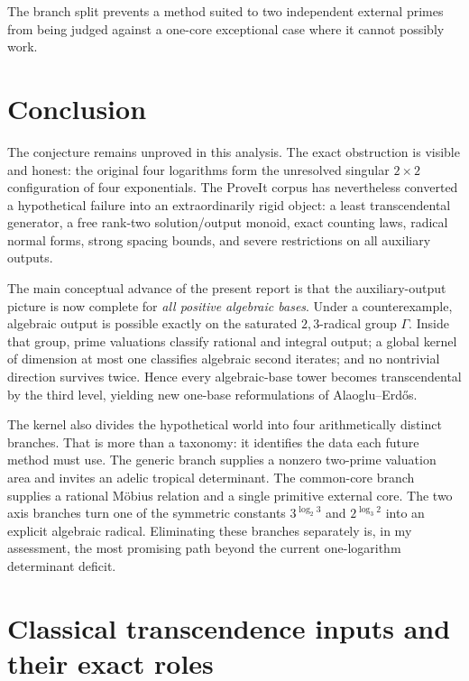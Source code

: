 \documentclass[11pt,oneside]{article}
\theoremstyle{definition}
\theoremstyle{remark}
\begin{document}
The branch split prevents a method suited to two independent external primes from being
judged against a one-core exceptional case where it cannot possibly work.

\section{Conclusion}

The conjecture remains unproved in this analysis.  The exact obstruction is visible and
honest: the original four logarithms form the unresolved singular $2\times2$ configuration
of four exponentials.  The ProveIt corpus has nevertheless converted a hypothetical failure
into an extraordinarily rigid object: a least transcendental generator, a free rank-two
solution/output monoid, exact counting laws, radical normal forms, strong spacing bounds, and
severe restrictions on all auxiliary outputs.

The main conceptual advance of the present report is that the auxiliary-output picture is now
complete for \emph{all positive algebraic bases}.  Under a counterexample, algebraic output is
possible exactly on the saturated $2,3$-radical group $\Gamma$.  Inside that group, prime
valuations classify rational and integral output; a global kernel of dimension at most one
classifies algebraic second iterates; and no nontrivial direction survives twice.  Hence every
algebraic-base tower becomes transcendental by the third level, yielding new one-base
reformulations of Alaoglu--Erd\H{o}s.

The kernel also divides the hypothetical world into four arithmetically distinct branches.
That is more than a taxonomy: it identifies the data each future method must use.  The generic
branch supplies a nonzero two-prime valuation area and invites an adelic tropical determinant.
The common-core branch supplies a rational M\"obius relation and a single primitive external
core.  The two axis branches turn one of the symmetric constants $3^{\log_2 3}$ and
$2^{\log_3 2}$ into an explicit algebraic radical.  Eliminating these branches separately is,
in my assessment, the most promising path beyond the current one-logarithm determinant
deficit.

\appendix

\section{Classical transcendence inputs and their exact roles}\label{app:classical}
\end{document}
